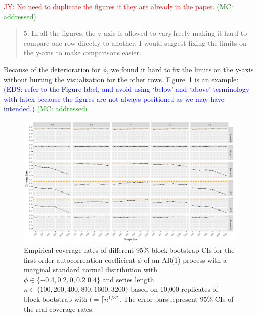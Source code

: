 \documentclass[12pt]{article}
\newcommand{\jy}[1]{\textcolor{red}{JY: #1}}
\newcommand{\eds}[1]{\textcolor{blue}{(EDS: #1)}}
\newcommand{\mc}[1]{\textcolor{green}{(MC: #1)}}
\newenvironment{comment}%
{\begin{quotation}\noindent\small\it\color{darkblue}\ignorespaces%
}{\end{quotation}}
\begin{document}



\jy{No  need to duplicate the figures if they are already in the paper.}
\mc{addressed}


\begin{comment}
5.  In all the figures, the y-axis is allowed to vary freely making it hard to 
compare one row directly to another.  I would suggest fixing the limits on the 
y-axis to make comparisons easier.  
\end{comment}

Because of the deterioration for $\phi$, we found it hard to fix the limits on 
the 
y-axis without hurting the visualization for the other rows. 
Figure~\ref{fig:alt_phi1} is an 
example:  \eds{refer to the Figure label, and avoid using `below' and `above'
terminology with latex because the figures are not always positioned as we may
have intended.}
\mc{addressed}

\begin{figure}[tbp]
  \centering
  \includegraphics[width=\textwidth]{figures/alt2plot_norm_phi_1}
  \caption{Empirical coverage rates of different 95\% block bootstrap CIs for 
    the first-order autocorrelation coefficient $\phi$ of an AR(1) process with 
    a marginal standard normal distribution with 
    $\phi \in \{-0.4, 0.2, 0, 0.2, 0.4\}$ and series length
    $n \in \{100, 200, 400, 800, 1600, 3200\}$ based on 10,000 replicates of
    block bootstrap with $l = \lceil n^{1/3} \rceil$. The
    error bars represent 95\% CIs of the real coverage rates.}
  \label{fig:alt_phi1}
\end{figure}
\end{document}
